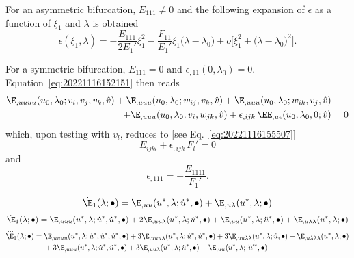 For an asymmetric bifurcation, \(E_{111} \neq 0\) and the following expansion of \(\epsilon\) as a function of \(\xi_1\) and \(\lambda\) is obtained
\begin{equation}
  \epsilon(\xi_1, \lambda) = -\frac{E_{111}}{2E_1'}\xi_1^2-\frac{F_{11}}{E_1'}\xi_1\bigl( \lambda - \lambda_0 \bigr) + o\bigl[ \xi_1^2 + \bigl( \lambda - \lambda_0 \bigr)^2 \bigr].
\end{equation}

For a symmetric bifurcation, \(E_{111} = 0\) and \(\epsilon_{,11}(0, \lambda_0) = 0\). Equation~\eqref{eq:20221116152151} then reads
\begin{equation}
  \begin{aligned}[b]
    \E_{,uuuu}(u_0, \lambda_0; v_i, v_j, v_k, \hat{v}) + \E_{,uuu}(u_0, \lambda_0; w_{ij}, v_k, \hat{v}) + \E_{,uuu}(u_0, \lambda_0; w_{ik}, v_j, \hat{v}) &\\
    + \E_{,uuu}(u_0, \lambda_0; v_i, w_{jk}, \hat{v}) + \epsilon_{,ijk} \, \EE_{,u\epsilon}(u_0, \lambda_0, 0; \hat{v}) &= 0
  \end{aligned}
\end{equation}
which, upon testing with \(v_l\), reduces to [see Eq.~\eqref{eq:20221116155507}]
\begin{equation}
  E_{ijkl} + \epsilon_{,ijk} \, F_l' = 0
\end{equation}
and
\begin{equation}
  \epsilon_{,111} = - \frac{E_{1111}}{F_1'}.
\end{equation}



\begin{equation*}
  \dot{\E}_1(\lambda; \bullet) = \E_{,uu}(u^\ast, \lambda; \dot{u}^\ast, \bullet) + \E_{,u\lambda}(u^\ast, \lambda; \bullet)
\end{equation*}
\begin{equation*}
  \ddot{\E}_1(\lambda; \bullet) = \E_{,uuu}(u^\ast, \lambda; \dot{u}^\ast, \dot{u}^\ast, \bullet) + 2\E_{,uu\lambda}(u^\ast, \lambda; \dot{u}^\ast, \bullet) + \E_{,uu}(u^\ast, \lambda; \ddot{u}^\ast, \bullet) + \E_{,u\lambda\lambda}(u^\ast, \lambda; \bullet)
\end{equation*}
\begin{equation*}
  \begin{aligned}[b]
    \dddot{\E}_1(\lambda; \bullet) ={} & \E_{,uuuu}(u^\ast, \lambda; \dot{u}^\ast, \dot{u}^\ast, \dot{u}^\ast, \bullet) + 3\E_{,uuu\lambda}(u^\ast, \lambda; \dot{u}^\ast, \dot{u}^\ast, \bullet) + 3\E_{,uu\lambda\lambda}(u^\ast, \lambda; \dot{u}, \bullet) + \E_{,u\lambda\lambda\lambda}(u^\ast, \lambda; \bullet)\\
                           &+ 3\E_{,uuu}(u^\ast, \lambda; \dot{u}^\ast, \ddot{u}^\ast, \bullet) + 3\E_{,uu\lambda}(u^\ast, \lambda; \ddot{u}^\ast, \bullet) + \E_{,uu}(u^\ast, \lambda; \dddot{u}^\ast, \bullet)
  \end{aligned}
\end{equation*}

